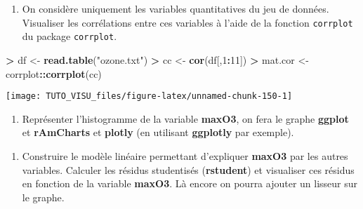 \documentclass[]{book}
\newenvironment{Shaded}{\begin{snugshade}}{\end{snugshade}}
\newcommand{\DataTypeTok}[1]{\textcolor[rgb]{0.13,0.29,0.53}{#1}}
\newcommand{\DecValTok}[1]{\textcolor[rgb]{0.00,0.00,0.81}{#1}}
\newcommand{\KeywordTok}[1]{\textcolor[rgb]{0.13,0.29,0.53}{\textbf{#1}}}
\newcommand{\NormalTok}[1]{#1}
\newcommand{\OperatorTok}[1]{\textcolor[rgb]{0.81,0.36,0.00}{\textbf{#1}}}
\newcommand{\StringTok}[1]{\textcolor[rgb]{0.31,0.60,0.02}{#1}}
\providecommand{\tightlist}{%
  \setlength{\itemsep}{0pt}\setlength{\parskip}{0pt}}
\theoremstyle{definition}
\theoremstyle{definition}
\theoremstyle{definition}
\theoremstyle{remark}
\begin{document}
\begin{enumerate}
\def\labelenumi{\alph{enumi}.}
\tightlist
\item
  On considère uniquement les variables quantitatives du jeu de données. Visualiser les corrélations entre ces variables à l'aide de la fonction \texttt{corrplot} du package \texttt{corrplot}.
\end{enumerate}

\begin{Shaded}
\begin{Highlighting}[]
\OperatorTok{>}\StringTok{ }\NormalTok{df <-}\StringTok{ }\KeywordTok{read.table}\NormalTok{(}\StringTok{"ozone.txt"}\NormalTok{)}
\OperatorTok{>}\StringTok{ }\NormalTok{cc <-}\StringTok{ }\KeywordTok{cor}\NormalTok{(df[,}\DecValTok{1}\OperatorTok{:}\DecValTok{11}\NormalTok{])}
\OperatorTok{>}\StringTok{ }\NormalTok{mat.cor <-}\StringTok{ }\NormalTok{corrplot}\OperatorTok{::}\KeywordTok{corrplot}\NormalTok{(cc)}
\end{Highlighting}
\end{Shaded}

\begin{center}\texttt{[image: TUTO\_VISU\_files/figure-latex/unnamed-chunk-150-1]} \end{center}

\begin{enumerate}
\def\labelenumi{\alph{enumi}.}
\setcounter{enumi}{1}
\tightlist
\item
  Représenter l'histogramme de la variable \textbf{maxO3}, on fera le graphe \textbf{ggplot} et \textbf{rAmCharts} et \textbf{plotly} (en utilisant \textbf{ggplotly} par exemple).
\end{enumerate}

\begin{Shaded}
\end{Shaded}

\begin{enumerate}
\def\labelenumi{\alph{enumi}.}
\setcounter{enumi}{2}
\tightlist
\item
  Construire le modèle linéaire permettant d'expliquer \textbf{maxO3} par les autres variables. Calculer les résidus studentisés (\textbf{rstudent}) et visualiser ces résidus en fonction de la variable \textbf{maxO3}. Là encore on pourra ajouter un lisseur sur le graphe.
\end{enumerate}
\end{document}
